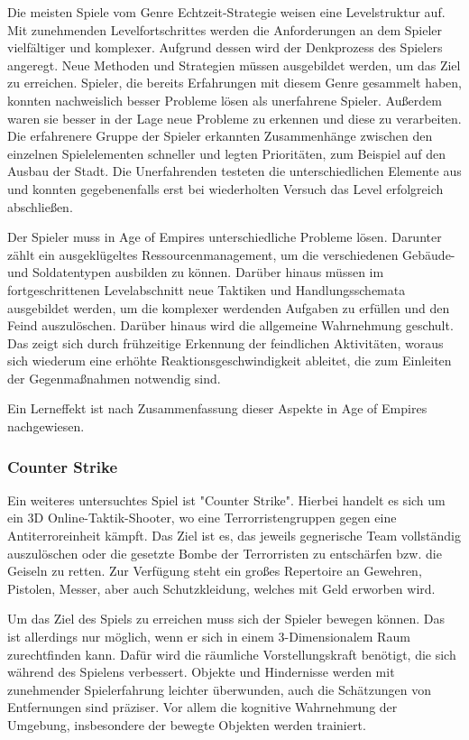 Die meisten Spiele vom Genre Echtzeit-Strategie weisen eine Levelstruktur auf. Mit zunehmenden Levelfortschrittes werden die Anforderungen an dem Spieler vielfältiger und komplexer. Aufgrund dessen wird der Denkprozess des Spielers angeregt. Neue Methoden und Strategien müssen ausgebildet werden, um das Ziel zu erreichen. Spieler, die bereits Erfahrungen mit diesem Genre gesammelt haben, konnten nachweislich besser Probleme lösen als unerfahrene Spieler. Außerdem waren sie besser in der Lage neue Probleme zu erkennen und diese zu verarbeiten. Die erfahrenere Gruppe der Spieler erkannten Zusammenhänge zwischen den einzelnen Spielelementen schneller und legten Prioritäten, zum Beispiel auf den Ausbau der Stadt. Die Unerfahrenden testeten die unterschiedlichen Elemente aus und konnten gegebenenfalls erst bei wiederholten Versuch  das Level erfolgreich abschließen. 

Der Spieler muss in Age of Empires unterschiedliche Probleme lösen. Darunter zählt ein ausgeklügeltes Ressourcenmanagement, um die verschiedenen Gebäude- und Soldatentypen ausbilden zu können. Darüber hinaus müssen im fortgeschrittenen Levelabschnitt neue Taktiken und Handlungsschemata ausgebildet werden, um die komplexer werdenden Aufgaben zu erfüllen und den Feind auszulöschen. Darüber hinaus wird die allgemeine Wahrnehmung geschult. Das zeigt sich durch frühzeitige Erkennung der feindlichen Aktivitäten, woraus sich wiederum eine erhöhte Reaktionsgeschwindigkeit ableitet, die zum Einleiten der Gegenmaßnahmen notwendig sind. 

Ein Lerneffekt ist nach Zusammenfassung dieser Aspekte in Age of Empires nachgewiesen.

\subsubsection{Counter Strike}
Ein weiteres untersuchtes Spiel ist "Counter Strike". Hierbei handelt es sich um ein 3D Online-Taktik-Shooter, wo eine Terrorristengruppen gegen eine Antiterroreinheit kämpft. Das Ziel ist es, das jeweils gegnerische Team vollständig auszulöschen oder die gesetzte Bombe der Terrorristen zu entschärfen bzw. die Geiseln zu retten. Zur Verfügung steht ein großes Repertoire an Gewehren, Pistolen, Messer, aber auch Schutzkleidung, welches mit Geld erworben wird.

Um das Ziel des Spiels zu erreichen muss sich der Spieler bewegen können. Das ist allerdings nur möglich, wenn er sich in einem 3-Dimensionalem Raum zurechtfinden kann. Dafür wird die räumliche Vorstellungskraft benötigt, die sich während des Spielens verbessert. Objekte und Hindernisse werden mit zunehmender Spielerfahrung leichter überwunden, auch die Schätzungen von Entfernungen sind präziser. Vor allem die kognitive Wahrnehmung der Umgebung, insbesondere der bewegte Objekten werden trainiert. 

